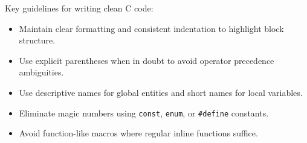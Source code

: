 \begin{remark}
    Key guidelines for writing clean C code:
    \begin{itemize}
        \item Maintain clear formatting and consistent indentation to highlight block structure.
        \item Use explicit parentheses when in doubt to avoid operator precedence ambiguities.
        \item Use descriptive names for global entities and short names for local variables.
        \item Eliminate magic numbers using \texttt{const}, \texttt{enum}, or \texttt{\#define} constants.
        \item Avoid function-like macros where regular inline functions suffice.
    \end{itemize}
\end{remark}
